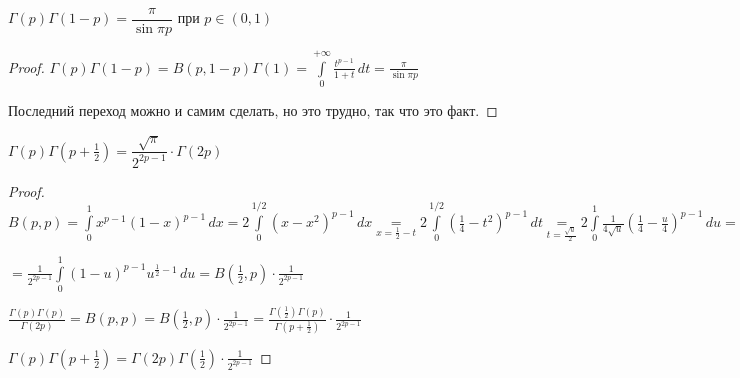 
\begin{consequence}\thmslashn
	
	$\Gamma(p)\Gamma(1-p) = \dfrac{\pi}{\sin \pi p}$ при $p \in (0, 1)$
	
\end{consequence}

\begin{proof}\thmslashn
	
	$\Gamma(p)\Gamma(1-p) = B(p, 1-p)\Gamma(1) = \int\limits_{0}^{+\infty} \frac{t^{p-1}}{1+t} \,dt = \frac{\pi}{\sin \pi p}$
	
	Последний переход можно и самим сделать, но это трудно, так что это факт.
	
\end{proof}


\begin{consequence}\thmslashn
	
	$\Gamma(p)\Gamma\left(p+\frac{1}{2}\right) = \dfrac{\sqrt{\pi}}{2^{2p-1}}\cdot \Gamma(2p)$
	
\end{consequence}

\begin{proof}\thmslashn
	
	$B(p, p) = \int\limits_{0}^{1} x^{p-1}(1-x)^{p-1}\,dx = 2 \int\limits_{0}^{1/2} (x-x^2)^{p-1}\,dx \underset{x = \frac{1}{2} - t} = 2 \int\limits_{0}^{1/2} \left(\frac{1}{4} - t^2 \right)^{p-1}\,dt \underset{t = \frac{\sqrt{u}}{2}}= 2 \int\limits_{0}^{1} \frac{1}{4\sqrt{u}}\left(\frac{1}{4} - \frac{u}{4} \right)^{p-1} \,du =$
	
	$= \frac{1}{2^{2p-1}} \int\limits_{0}^1 (1-u)^{p-1} u^{\frac{1}{2}-1}\,du = B\left(\frac{1}{2}, p \right) \cdot \frac{1}{2^{2p-1}}$
	
	$\frac{\Gamma(p)\Gamma(p)}{\Gamma(2p)} = B(p, p) = B\left(\frac{1}{2}, p \right) \cdot \frac{1}{2^{2p-1}} = \frac{\Gamma\left(\frac{1}{2} \right)\Gamma(p)}{\Gamma\left(p+\frac{1}{2} \right)} \cdot \frac{1}{2^{2p-1}}$
	
	$\Gamma(p)\Gamma\left(p+\frac{1}{2} \right) = \Gamma\left(2p\right)\Gamma\left(\frac{1}{2} \right)\cdot \frac{1}{2^{2p-1}}$
	
\end{proof}
